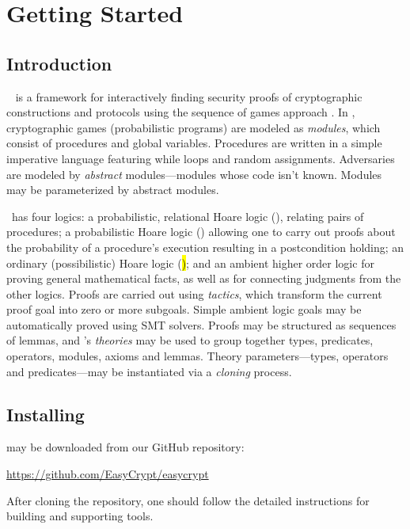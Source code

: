 \chapter{Getting Started}

\section{Introduction}

\EasyCrypt\ \cite{barthe-easycrypt-intro-2014,barthe-crypto-2011} is a
framework for interactively finding security proofs of cryptographic
constructions and protocols using the sequence of games approach
\cite{bellare-rogaway-code-based-2004,%
  bellare-rogaway-triple-enc-2006,shoup-seq-games-2004}.  In
\EasyCrypt, cryptographic games (probabilistic programs) are modeled
as \emph{modules}, which consist of procedures and global variables.
Procedures are written in a simple imperative language featuring while
loops and random assignments. Adversaries are modeled by \emph{abstract}
modules---modules whose code isn't known. Modules may be parameterized
by abstract modules.

\EasyCrypt\ has four logics: a probabilistic, relational Hoare logic
(\prhl), relating pairs of procedures; a probabilistic Hoare logic
(\phl) allowing one to carry out proofs about the probability of a
procedure's execution resulting in a postcondition holding; an
ordinary (possibilistic) Hoare logic (\hl); and an ambient higher
order logic for proving general mathematical facts, as well as for
connecting judgments from the other logics.  Proofs are carried out
using \emph{tactics}, which transform the current proof goal into zero
or more subgoals. Simple ambient logic goals may be automatically
proved using SMT solvers. Proofs may be structured as sequences of
lemmas, and \EasyCrypt's \emph{theories} may be used to group together
types, predicates, operators, modules, axioms and lemmas. Theory
parameters---types, operators and predicates---may be instantiated via
a \emph{cloning} process.

\section{Installing \EasyCrypt}

\EasyCrypt may be downloaded from our GitHub repository:
\begin{center}
  \url{https://github.com/EasyCrypt/easycrypt}
\end{center}
After cloning the repository, one should follow the detailed
instructions for building \EasyCrypt and supporting tools.

